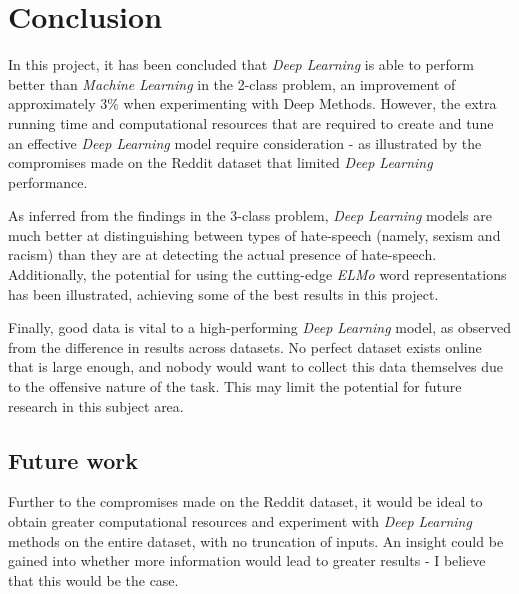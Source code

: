 \documentclass[12pt,a4paper]{article}
\begin{document}
\section{Conclusion}
In this project, it has been concluded that \textit{Deep Learning} is able to perform better than \textit{Machine Learning} in the 2-class problem, an improvement of approximately 3\% when experimenting with Deep Methods. However, the extra running time and computational resources that are required to create and tune an effective \textit{Deep Learning} model require consideration - as illustrated by the compromises made on the Reddit dataset that limited \textit{Deep Learning} performance. 

As inferred from the findings in the 3-class problem, \textit{Deep Learning} models are much better at distinguishing between types of hate-speech (namely, sexism and racism) than they are at detecting the actual presence of hate-speech. Additionally, the potential for using the cutting-edge \textit{ELMo} word representations has been illustrated, achieving some of the best results in this project.

Finally, good data is vital to a high-performing \textit{Deep Learning} model, as observed from the difference in results across datasets. No perfect dataset exists online that is large enough, and nobody would want to collect this data themselves due to the offensive nature of the task. This may limit the potential for future research in this subject area.

\subsection{Future work}
Further to the compromises made on the Reddit dataset, it would be ideal to obtain greater computational resources and experiment with \textit{Deep Learning} methods on the entire dataset, with no truncation of inputs. An insight could be gained into whether more information would lead to greater results - I believe that this would be the case.
\end{document}
